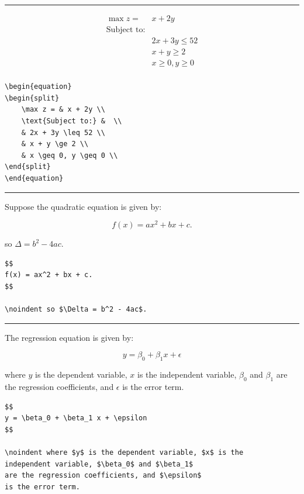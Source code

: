\documentclass[12pt]{article}
\begin{document}
\hrule 

\begin{equation}
\begin{split}
    \max z = & x + 2y \\
    \text{Subject to:} &  \\
    & 2x + 3y \leq 52 \\
    & x + y \ge 2 \\
    & x \geq 0, y \geq 0 \\
\end{split}
\end{equation}


\begin{verbatim}
\begin{equation}
\begin{split}
    \max z = & x + 2y \\
    \text{Subject to:} &  \\
    & 2x + 3y \leq 52 \\
    & x + y \ge 2 \\
    & x \geq 0, y \geq 0 \\
\end{split}
\end{equation}
\end{verbatim}


\hrule

Suppose the quadratic equation is given by:

$$
f(x) = ax^2 + bx + c.
$$

\noindent so $\Delta = b^2 - 4ac$.


\begin{verbatim}
$$
f(x) = ax^2 + bx + c.
$$

\noindent so $\Delta = b^2 - 4ac$.
\end{verbatim}

\hrule 

The regression equation is given by:

$$
y = \beta_0 + \beta_1 x + \epsilon
$$

\noindent where $y$ is the dependent variable, $x$ is the independent variable, $\beta_0$ and $\beta_1$ 
are the regression coefficients, and $\epsilon$ is the error term.

\begin{verbatim}
$$
y = \beta_0 + \beta_1 x + \epsilon
$$

\noindent where $y$ is the dependent variable, $x$ is the 
independent variable, $\beta_0$ and $\beta_1$ 
are the regression coefficients, and $\epsilon$ 
is the error term.
\end{verbatim}
\end{document}
